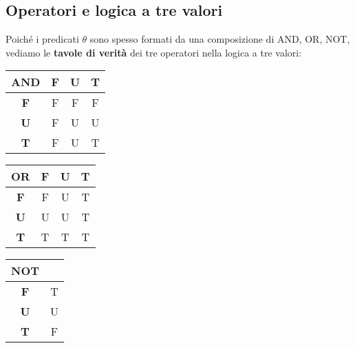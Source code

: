 \subsection{Operatori e logica a tre valori}
Poiché i predicati $\theta$ sono spesso formati da una composizione di AND, OR, NOT, vediamo le \textbf{tavole di verità} dei tre operatori nella logica a tre valori:
    \begin{center}
        \begin{tabular}{|c|c|c|c|}\hline
            \textbf{AND} & \textbf{F} & \textbf{U} & \textbf{T} \\ \hline
            \textbf{F} & F & F & F \\ \hline
            \textbf{U} & F & U & U \\ \hline
            \textbf{T} & F & U & T \\ \hline
        \end{tabular} \quad
        \begin{tabular}{|c|c|c|c|}\hline
            \textbf{OR} & \textbf{F} & \textbf{U} & \textbf{T} \\ \hline
            \textbf{F} & F & U & T \\ \hline
            \textbf{U} & U & U & T \\ \hline
            \textbf{T} & T & T & T \\ \hline
        \end{tabular} \quad
        \begin{tabular}{|c|c|}\hline
            \textbf{NOT} & \\ \hline
            \textbf{F} & T \\ \hline
            \textbf{U} & U \\ \hline
            \textbf{T} & F \\ \hline
        \end{tabular} 
    \end{center}

